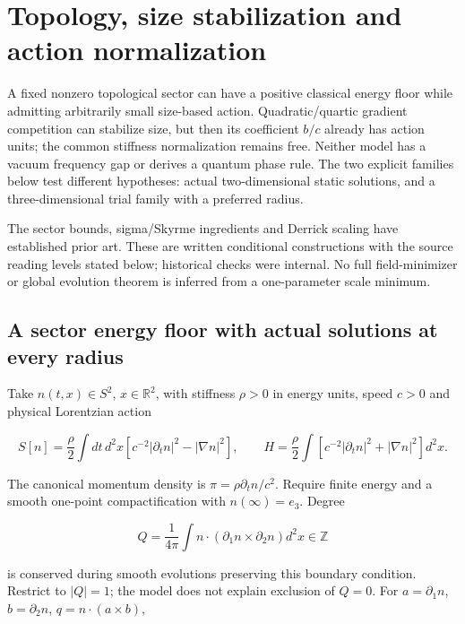 \documentclass[11pt,a4paper]{article}
\begin{document}
\hypertarget{topology-size-stabilization-and-action-normalization}{%
\section{Topology, size stabilization and action
normalization}\label{topology-size-stabilization-and-action-normalization}}

A fixed nonzero topological sector can have a positive classical energy
floor while admitting arbitrarily small size-based action.
Quadratic/quartic gradient competition can stabilize size, but then its
coefficient \(b/c\) already has action units; the common stiffness
normalization remains free. Neither model has a vacuum frequency gap or
derives a quantum phase rule. The two explicit families below test
different hypotheses: actual two-dimensional static solutions, and a
three-dimensional trial family with a preferred radius.

The sector bounds, sigma/Skyrme ingredients and Derrick scaling have
established prior art. These are written conditional constructions with
the source reading levels stated below; historical checks were internal.
No full field-minimizer or global evolution theorem is inferred from a
one-parameter scale minimum.

\hypertarget{a-sector-energy-floor-with-actual-solutions-at-every-radius}{%
\subsection{A sector energy floor with actual solutions at every
radius}\label{a-sector-energy-floor-with-actual-solutions-at-every-radius}}

Take \(n(t,x)\in S^2\), \(x\in\mathbb R^2\), with stiffness \(\rho>0\)
in energy units, speed \(c>0\) and physical Lorentzian action

\[S[n]=\frac\rho2\int dt\,d^2x
 [c^{-2}|\partial_tn|^2-|\nabla n|^2],\qquad
H=\frac\rho2\int[c^{-2}|\partial_tn|^2+|\nabla n|^2]d^2x.\]

The canonical momentum density is \(\pi=\rho\partial_tn/c^2\). Require
finite energy and a smooth one-point compactification with
\(n(\infty)=e_3\). Degree

\[Q=\frac1{4\pi}\int n\cdot(\partial_1n\times\partial_2n)d^2x\in\mathbb Z\]

is conserved during smooth evolutions preserving this boundary
condition. Restrict to \(|Q|=1\); the model does not explain exclusion
of \(Q=0\). For \(a=\partial_1n\), \(b=\partial_2n\),
\(q=n\cdot(a\times b)\),
\end{document}
